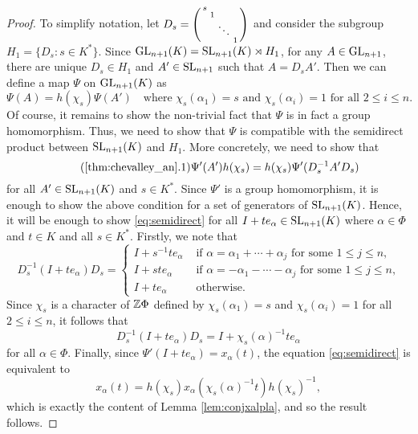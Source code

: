 \begin{proof}
    To simplify notation, let $D_s=\begin{psmallmatrix}
        s &  & & \\
         & 1 & & \\
         & & \ddots & \\
         & & & 1\\
    \end{psmallmatrix}$ and consider the subgroup $H_1=\{D_s:s\in K^*\}$. Since 
    $\mathrm{GL}_{n+1}(K)=\mathrm{SL}_{n+1}(K)\rtimes H_1$, for any $A\in\mathrm{GL}_{n+1}$, there are unique $D_s\in H_1$ and $A'\in\mathrm{SL}_{n+1}$ such that $A=D_s A'$. Then we can define a map $\Psi$ on $\mathrm{GL}_{n+1}(K)$ as 
    $$\Psi(A)=h(\chi_s)\Psi(A')\quad\text{where }\chi_s(\alpha_1)=s \text{ and }\chi_s(\alpha_i)=1 \text{ for all }2\leq i\leq n.$$
    Of course, it remains to show the non-trivial fact that $\Psi$ is in fact a group homomorphism. Thus, we need to show that $\Psi$ is compatible with the semidirect product between $\mathrm{SL}_{n+1}(K)$ and $H_1$. More concretely, we need to show that 
    \begin{equation}\tag{\ref{thm:chevalley_an}.1}\label{eq:semidirect}
        \Psi'(A')h(\chi_s)=h(\chi_s)\Psi'(D_s^{-1}A'D_s)
    \end{equation}
    for all $A'\in\mathrm{SL}_{n+1}(K)$ and $s\in K^*$. Since $\Psi'$ is a group homomorphism, it is enough to show the above condition for a set of generators of $\mathrm{SL}_{n+1}(K)$. Hence, it will be enough to show \eqref{eq:semidirect} for all $I+t e_\alpha\in\mathrm{SL}_{n+1}(K)$ where $\alpha\in\Phi$ and $t\in K$ and all $s\in K^*$. Firstly, we note that 
    $$D_s^{-1}(I+t e_\alpha)D_s=\begin{cases}
        I+s^{-1}t e_\alpha & \text{ if }\alpha=\alpha_1+\cdots+\alpha_j \text{ for some $1\leq j\leq n$,}\\
        I+st e_\alpha & \text{ if }\alpha=-\alpha_1-\cdots-\alpha_j \text{ for some $1\leq j\leq n$,}\\
        I+te_\alpha & \text{ otherwise}.
    \end{cases}$$
    Since $\chi_s$ is a character of $\mathbb{Z}\Phi$ defined by $\chi_s(\alpha_1)=s$ and $\chi_s(\alpha_i)=1$ for all $2\leq i\leq n$, it follows that
    $$D_s^{-1}(I+te_\alpha)D_s=I+\chi_s(\alpha)^{-1}te_\alpha$$
    for all $\alpha\in\Phi$. Finally, since $\Psi'(I+t e_\alpha)=x_\alpha(t)$, the equation \eqref{eq:semidirect} is equivalent to 
    $$x_\alpha(t)=h(\chi_s)x_\alpha(\chi_s(\alpha)^{-1}t)h(\chi_s)^{-1},$$
    which is exactly the content of Lemma \ref{lem:conjxalpla}, and so the result follows. 
\end{proof}